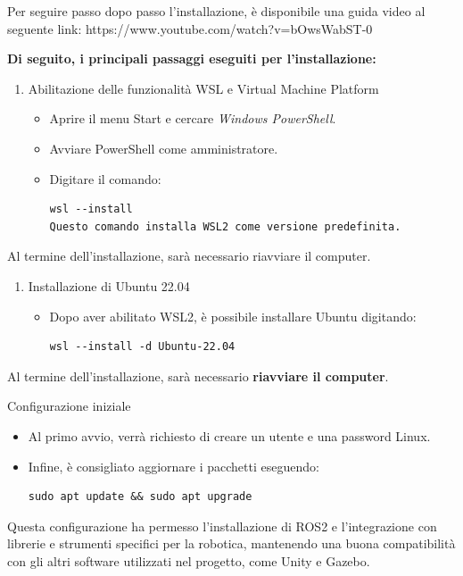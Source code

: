 \documentclass[11pt]{report}
\begin{document}
Per seguire passo dopo passo l’installazione, è disponibile una guida video al seguente link: https://www.youtube.com/watch?v=bOwsWabST-0


\textbf{Di seguito, i principali passaggi eseguiti per l’installazione:}

\begin{enumerate}
    \item Abilitazione delle funzionalità WSL e Virtual Machine Platform
    \begin{itemize}
        \item Aprire il menu Start e cercare \textit{Windows PowerShell}.
        \item Avviare PowerShell come amministratore.
        \item Digitare il comando:
        \begin{verbatim}
wsl --install
Questo comando installa WSL2 come versione predefinita.
        \end{verbatim}
    \end{itemize}
\end{enumerate}
Al termine dell’installazione, sarà necessario riavviare il computer.

\begin{enumerate}
\item Installazione di Ubuntu 22.04
    \begin{itemize}
        \item Dopo aver abilitato WSL2, è possibile installare Ubuntu digitando:
        \begin{verbatim}
wsl --install -d Ubuntu-22.04
        \end{verbatim}
    \end{itemize}
\end{enumerate}

Al termine dell’installazione, sarà necessario \textbf{riavviare il computer}.


Configurazione iniziale
\begin{itemize}
    \item Al primo avvio, verrà richiesto di creare un utente e una password Linux.
    \item Infine, è consigliato aggiornare i pacchetti eseguendo:
    \begin{verbatim}
sudo apt update && sudo apt upgrade
    \end{verbatim}
\end{itemize}

Questa configurazione ha permesso l’installazione di ROS2 e l’integrazione con librerie e strumenti specifici per la robotica, mantenendo una buona compatibilità con gli altri software utilizzati nel progetto, come Unity e Gazebo.
\end{document}
